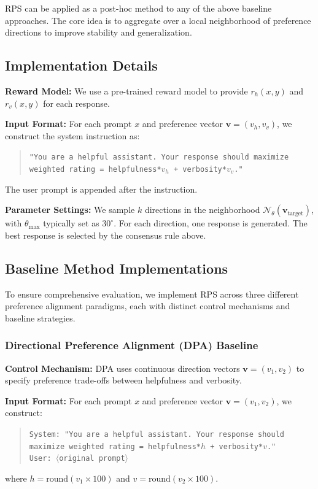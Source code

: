 \documentclass{article} %
\begin{document}
RPS can be applied as a post-hoc method to any of the above baseline approaches. The core idea is to aggregate over a local neighborhood of preference directions to improve stability and generalization.

\subsection{Implementation Details}

\textbf{Reward Model:} We use a pre-trained reward model to provide $r_h(x, y)$ and $r_v(x, y)$ for each response.

\textbf{Input Format:} For each prompt $x$ and preference vector $\mathbf{v} = (v_h, v_v)$, we construct the system instruction as:
\begin{quote}
\texttt{"You are a helpful assistant. Your response should maximize weighted rating = helpfulness*$v_h$ + verbosity*$v_v$."}
\end{quote}
The user prompt is appended after the instruction.

\textbf{Parameter Settings:} We sample $k$ directions in the neighborhood $\mathcal{N}_\theta(\mathbf{v}_{\text{target}})$, with $\theta_{\max}$ typically set as $30^\circ$. For each direction, one response is generated. The best response is selected by the consensus rule above.

\subsection{Baseline Method Implementations}

To ensure comprehensive evaluation, we implement RPS across three different preference alignment paradigms, each with distinct control mechanisms and baseline strategies.

\subsubsection{Directional Preference Alignment (DPA) Baseline}

\textbf{Control Mechanism:} DPA uses continuous direction vectors $\mathbf{v} = (v_1, v_2)$ to specify preference trade-offs between helpfulness and verbosity.

\textbf{Input Format:} For each prompt $x$ and preference vector $\mathbf{v} = (v_1, v_2)$, we construct:
\begin{quote}
\texttt{System: "You are a helpful assistant. Your response should maximize weighted rating = helpfulness*$h$ + verbosity*$v$."} \\
\texttt{User: $\langle$original prompt$\rangle$}
\end{quote}
where $h = \text{round}(v_1 \times 100)$ and $v = \text{round}(v_2 \times 100)$.
\end{document}

